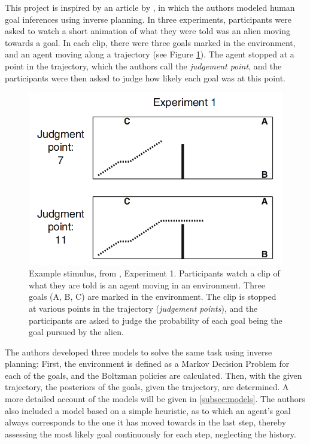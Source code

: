 This project is inspired by an article by , in which the authors modeled human goal inferences using inverse planning.
In three experiments, participants were asked to watch a short animation of what they were told was an alien moving towards a goal. In each clip, there were three goals marked in the environment, and an agent moving along a trajectory (see Figure \ref{fig:tenenbaum:env}).
The agent stopped at a point in the trajectory, which the authors call the \textit{judgement point}, and the participants were then asked to judge how likely each goal was at this point.

\begin{figure}
	\centering
	\includegraphics[width=0.7\linewidth, trim=15pt 0pt 0pt 15pt, clip]{intro/tenenbaum_exp}
	\caption{Example stimulus, from , Experiment 1. Participants watch a clip of what they are told is an agent moving in an environment. Three goals (A, B, C) are marked in the environment. The clip is stopped at various points in the trajectory (\textit{judgement points}), and the participants are asked to judge the probability of each goal being the goal pursued by the alien.}
	\label{fig:tenenbaum:env}
\end{figure}


The authors developed three models to solve the same task using inverse planning:
First, the environment is defined as a Markov Decision Problem for each of the goals, and the Boltzman policies are calculated. Then, with the given trajectory, the posteriors of the goals, given the trajectory, are determined. 
A more detailed account of the models will be given in \ref{subsec:models}. The authors also included a model based on a simple heuristic, as to which an agent's goal always corresponds to the one it has moved towards in the last step, thereby assessing the most likely goal continuously for each step, neglecting the history.

